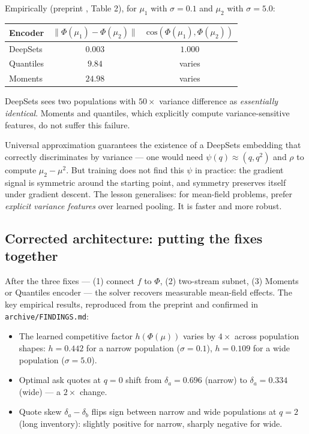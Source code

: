 Empirically (preprint \cite{garry2026preprint2}, Table 2), for $\mu_1$ with $\sigma = 0.1$ and $\mu_2$ with $\sigma = 5.0$:
\begin{table}[h]
\centering
\begin{tabular}{@{}lcc@{}}
\toprule
Encoder & $\|\Phi(\mu_1) - \Phi(\mu_2)\|$ & $\text{cos}(\Phi(\mu_1), \Phi(\mu_2))$ \\ \midrule
DeepSets & $0.003$ & $\mathbf{1.000}$ \\
Quantiles & $9.84$ & varies \\
Moments & $\mathbf{24.98}$ & varies \\ \bottomrule
\end{tabular}
\end{table}

DeepSets sees two populations with $50\times$ variance difference as \emph{essentially identical}. Moments and quantiles, which explicitly compute variance-sensitive features, do not suffer this failure.

\begin{intuition}
Universal approximation guarantees the existence of a DeepSets embedding that correctly discriminates by variance --- one would need $\psi(q) \approx (q, q^2)$ and $\rho$ to compute $\mu_2 - \mu^2$. But training does not find this $\psi$ in practice: the gradient signal is symmetric around the starting point, and symmetry preserves itself under gradient descent. The lesson generalises: for mean-field problems, prefer \emph{explicit variance features} over learned pooling. It is faster and more robust.
\end{intuition}

\subsection{Corrected architecture: putting the fixes together}

After the three fixes --- (1) connect $f$ to $\Phi$, (2) two-stream subnet, (3) Moments or Quantiles encoder --- the solver recovers measurable mean-field effects. The key empirical results, reproduced from the preprint and confirmed in \texttt{archive/FINDINGS.md}:

\begin{itemize}[leftmargin=2em]
  \item The learned competitive factor $h(\Phi(\mu))$ varies by $4\times$ across population shapes: $h = 0.442$ for a narrow population ($\sigma = 0.1$), $h = 0.109$ for a wide population ($\sigma = 5.0$).
  \item Optimal ask quotes at $q = 0$ shift from $\delta_a = 0.696$ (narrow) to $\delta_a = 0.334$ (wide) --- a $2\times$ change.
  \item Quote skew $\delta_a - \delta_b$ flips sign between narrow and wide populations at $q = 2$ (long inventory): slightly positive for narrow, sharply negative for wide.
\end{itemize}

